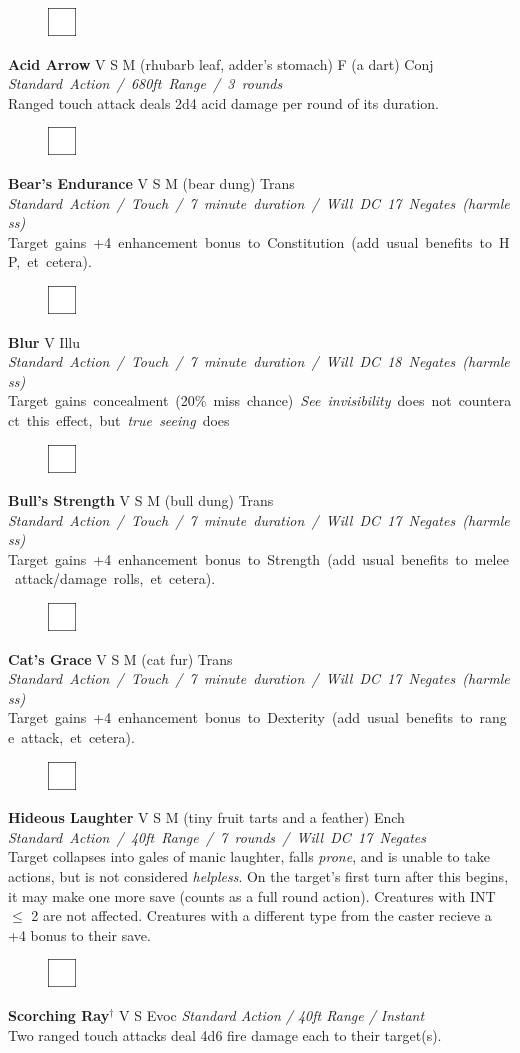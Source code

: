 \documentclass[letterpaper]{article}
\newcommand{\e}[1]{\emph{#1}}
\newcommand{\B}[1]{\textbf{#1}}
\newcommand{\D}[0]{$^\dag$}
\newcommand{\spell}[7]{
\begin{figure}
\vspace{-13pt}
\ifstrequal{#2}{Full}{  \includegraphics[width=2em]{Checkbox-Full}}{
\ifstrequal{#2}{Scroll}{\includegraphics[width=2em]{Checkbox-S}}{
                        \includegraphics[width=2em]{Checkbox}}}
\ifstrequal{#7}{}{\vspace{-1em}}{\vspace{#7}}
\end{figure}
 \B{#1} #3 {
    \ifstrequal{#4}{Conj}{\color{Plum}Conj}{%
    \ifstrequal{#4}{Divin}{\color{YellowOrange}Divin}{%
    \ifstrequal{#4}{Ench}{\color{VioletRed}Ench}{%
    \ifstrequal{#4}{Trans}{\color{LimeGreen}Trans}{%
    \ifstrequal{#4}{Evoc}{\color{RedOrange}Evoc}{%
    \ifstrequal{#4}{Illu}{\color{ProcessBlue}Illu}{%
    \ifstrequal{#4}{Abjur}{\color{CadetBlue}Abjur}{%
    \ifstrequal{#4}{Necro}{\color{Red}Necro}{%
}}}}}}}}}
{\footnotesize \e{#5}} \\
#6
}
\begin{document}
\spell{Acid Arrow}{}{V S M (rhubarb leaf, adder's stomach) F (a dart)}{Conj}{\mbox{Standard Action / 680ft Range / 3 rounds}}{%
Ranged touch attack deals 2d4 acid damage per round of its duration.}{}\\[-1em] %

\spell{Bear's Endurance}{}{V S M (bear dung)}{Trans}{\mbox{Standard Action / Touch / 7 minute duration / Will DC 17 Negates (harmless)}} {%
\mbox{Target gains +4 enhancement bonus to Constitution (add usual benefits to HP, et cetera).} }{}\\[-1em] %

\spell{Blur}{}{V}{Illu}{\mbox{Standard Action / Touch / 7 minute duration / Will DC 18 Negates (harmless)}}{%
\mbox{Target gains concealment (20\% miss chance) \e{See invisibility} does not counteract this effect, but \e{true seeing} does} }{}\\[-1em] %

\spell{Bull's Strength}{}{V S M (bull dung)}{Trans}{\mbox{Standard Action / Touch / 7 minute duration / Will DC 17 Negates (harmless)}}{%
\mbox{Target gains +4 enhancement bonus to Strength (add usual benefits to melee attack/damage rolls, et cetera).} }{}\\[-1em] %

\spell{Cat's Grace}{}{V S M (cat fur)}{Trans}{\mbox{Standard Action / Touch / 7 minute duration / Will DC 17 Negates (harmless)}}{%
\mbox{Target gains +4 enhancement bonus to Dexterity (add usual benefits to range attack, et cetera).} }{}\\[-1em] %

\spell{Hideous Laughter}{}{V S M (tiny fruit tarts and a feather)}{Ench}{\mbox{Standard Action / 40ft Range / 7 rounds / Will DC 17 Negates }}{%
Target collapses into gales of manic laughter, falls \e{prone}, and is unable to take actions, but is not considered \e{helpless}. On the target's first turn after this begins, it may make one more save (counts as a full round action).  Creatures with INT $\leq$ 2 are not affected.  Creatures with a different type from the caster recieve a +4 bonus to their save.}{0em} %

\spell{Scorching Ray\D}{}{V S}{Evoc}{Standard Action / 40ft Range / Instant}{%
Two ranged touch attacks deal 4d6 fire damage each to their target(s).}{}\\[-1em] %
\end{document}
